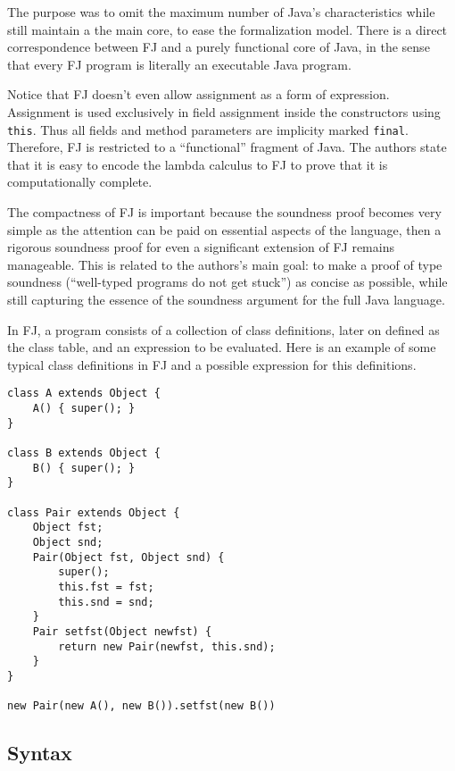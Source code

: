 The purpose was to omit the maximum number of Java's characteristics while still
maintain a the main core, to ease the formalization model.
There is a direct correspondence between FJ and a purely functional core of
Java, in the sense that every FJ program is literally an executable Java
program.

Notice that FJ doesn't even allow assignment as a form of expression.
Assignment is used exclusively in field assignment inside the  constructors
using \texttt{this}. Thus all fields and method parameters are implicity marked
\texttt{final}. Therefore, FJ is restricted to a ``functional'' fragment of
Java. The authors state that it is easy to encode the lambda calculus to FJ to
prove that it is computationally complete.

The compactness of FJ is important because the soundness proof becomes very
simple as the attention can be paid on essential aspects of the language, then
a rigorous soundness proof for even a significant extension of FJ remains
manageable. This is related to the authors's main goal: to make a proof of type
soundness (``well-typed programs do not get stuck'') as concise as possible, while
still capturing the essence of the soundness argument for the full Java language.

In FJ, a program consists of a collection of class definitions, later on defined
as the class table, and an expression to be evaluated. Here is an example of some typical
class definitions in FJ and a possible expression for this definitions.

\begin{verbatim} 
class A extends Object {
    A() { super(); } 
} 

class B extends Object { 
    B() { super(); }
} 

class Pair extends Object { 
    Object fst; 
    Object snd;
    Pair(Object fst, Object snd) { 
        super(); 
        this.fst = fst; 
        this.snd = snd; 
    } 
    Pair setfst(Object newfst) { 
        return new Pair(newfst, this.snd); 
    } 
} 

new Pair(new A(), new B()).setfst(new B())
\end{verbatim}

\subsection{Syntax}



